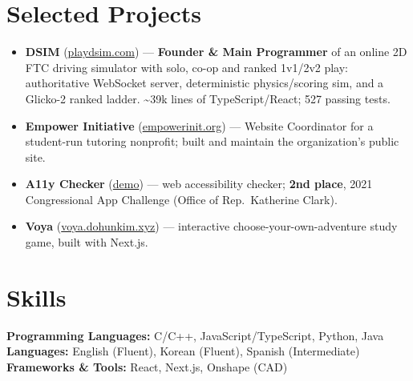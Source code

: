 \documentclass[letterpaper,11pt]{article}
\begin{document}
\section{Selected Projects}
\begin{itemize}
  \item \textbf{DSIM} (\href{https://www.playdsim.com}{playdsim.com}) --- \textbf{Founder \& Main Programmer} of an online 2D FTC driving simulator with solo, co-op and ranked 1v1/2v2 play: authoritative WebSocket server, deterministic physics/scoring sim, and a Glicko-2 ranked ladder. \textasciitilde39k lines of TypeScript/React; 527 passing tests.
  \item \textbf{Empower Initiative} (\href{https://empowerinit.org}{empowerinit.org}) --- Website Coordinator for a student-run tutoring nonprofit; built and maintain the organization's public site.
  \item \textbf{A11y Checker} (\href{https://youtu.be/qvqzYHCsRM8}{demo}) --- web accessibility checker; \textbf{2nd place}, 2021 Congressional App Challenge (Office of Rep.\ Katherine Clark).
  \item \textbf{Voya} (\href{https://voya.dohunkim.xyz}{voya.dohunkim.xyz}) --- interactive choose-your-own-adventure study game, built with Next.js.
\end{itemize}

\section{Skills}
\textbf{Programming Languages:} C/C++, JavaScript/TypeScript, Python, Java\\
\textbf{Languages:} English (Fluent), Korean (Fluent), Spanish (Intermediate)\\
\textbf{Frameworks \& Tools:} React, Next.js, Onshape (CAD)
\end{document}
